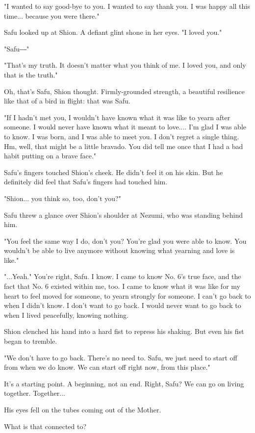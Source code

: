 "I wanted to say good-bye to you. I wanted to say thank you. I was happy
all this time... because you were there."

Safu looked up at Shion. A defiant glint shone in her eyes. "I loved
you."

"Safu―"

"That's my truth. It doesn't matter what you think of me. I loved you,
and only that is the truth."

Oh, that's Safu, Shion thought. Firmly-grounded strength, a beautiful
resilience like that of a bird in flight: that was Safu.

"If I hadn't met you, I wouldn't have known what it was like to yearn
after someone. I would never have known what it meant to love.... I'm
glad I was able to know. I was born, and I was able to meet you. I don't
regret a single thing. Hm, well, that might be a little bravado. You did
tell me once that I had a bad habit putting on a brave face."

Safu's fingers touched Shion's cheek. He didn't feel it on his skin. But
he definitely did feel that Safu's fingers had touched him.

"Shion... you think so, too, don't you?"

Safu threw a glance over Shion's shoulder at Nezumi, who was standing
behind him.

"You feel the same way I do, don't you? You're glad you were able to
know. You wouldn't be able to live anymore without knowing what yearning
and love is like."

"...Yeah." You're right, Safu. I know. I came to know No. 6's true face,
and the fact that No. 6 existed within me, too. I came to know what it
was like for my heart to feel moved for someone, to yearn strongly for
someone. I can't go back to when I didn't know. I don't want to go back.
I would never want to go back to when I lived peacefully, knowing
nothing.

Shion clenched his hand into a hard fist to repress his shaking. But
even his fist began to tremble.

"We don't have to go back. There's no need to. Safu, we just need to
start off from when we do know. We can start off right now, from this
place."

It's a starting point. A beginning, not an end. Right, Safu? We can go
on living together. Together...

His eyes fell on the tubes coming out of the Mother.

What is that connected to?

